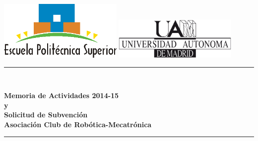 \documentclass[12pt,twoside]{report}
\date{Diciembre de 2015}
\newcommand{\reporttitle}{
	Memoria de Actividades 2014-15\\
	y \\
	Solicitud de Subvención
}
\newcommand{\reportauthor}{Asociación Club de Robótica-Mecatrónica}
\begin{document}
\begin{titlepage}

\newcommand{\HRule}{\rule{\linewidth}{1mm}} %



\includegraphics[width = 6cm]{fotos/logo-eps.png}
\hfill
\includegraphics[width = 6cm]{fotos/logo-uam.png}



\center %


\vspace{1cm}



\HRule \\[0.4cm]
\begin{spacing}{1.5}
{ \fontsize{0.8cm}{1em} \bfseries \reporttitle}\\ %
\vspace{0.5cm}
{ \fontsize{0.7cm}{1em} \bfseries \reportauthor} \\
\end{spacing}
\HRule \\[1.5cm]



\end{titlepage}
\end{document}
